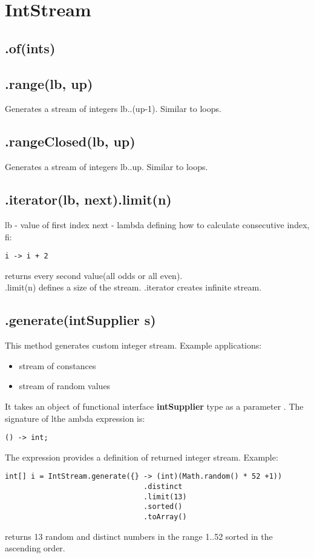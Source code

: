 \documentclass{report}
\begin{document}
\section{IntStream}
\subsection{.of(ints)}

\subsection{.range(lb, up)}
Generates a stream of integers lb..(up-1). Similar to loops.

\subsection{.rangeClosed(lb, up)}
Generates a stream of integers lb..up. Similar to loops.

\subsection{.iterator(lb, next).limit(n)}
lb - value of first index
next - lambda defining how to calculate consecutive index, fi:
\begin{verbatim}
i -> i + 2
\end{verbatim}
returns every second value(all odds or all even).\\
.limit(n) defines a size of the stream. .iterator creates infinite stream.


\subsection{.generate(intSupplier s)}
This method generates custom integer stream. Example applications:
\begin{itemize}
	\item stream of constances
	\item stream of random values
\end{itemize}
It takes an object of functional interface \textbf{intSupplier} type as a parameter . The signature of lthe ambda expression is:
\begin{verbatim}
() -> int;
\end{verbatim} 
The expression provides a definition of returned integer stream. Example:
\begin{verbatim}
int[] i = IntStream.generate({} -> (int)(Math.random() * 52 +1))
                                .distinct
                                .limit(13)
                                .sorted()
                                .toArray()
\end{verbatim}
returns 13 random and distinct numbers in the range 1..52 sorted in the ascending order.
\end{document}
